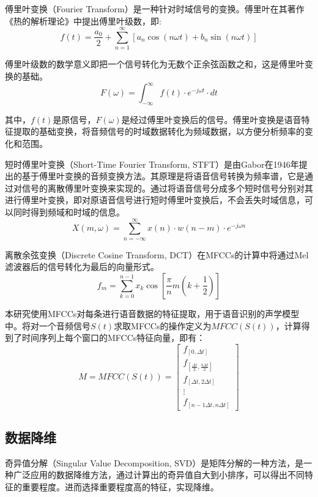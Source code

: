 \documentclass[lang=cn,cite=super]{elegantpaper}
\begin{document}
傅里叶变换（Fourier Transform）是一种针对时域信号的变换。傅里叶在其著作《热的解析理论》\cite{baron2003analytical}中提出傅里叶级数，即:
\begin{equation}
    f(t) = \frac{a_0}{2} +\sum_{n=1}^{\infty} [a_n \cos(n\omega t)+b_n\sin(n\omega t)]
\end{equation}

傅里叶级数的数学意义即把一个信号转化为无数个正余弦函数之和，这是傅里叶变换的基础。
\begin{equation}
    F(\omega) = \int_{-\infty}^{\infty} f(t) \cdot e^{-j\omega t} \cdot dt
\end{equation}

其中，$f(t)$是原信号，$F(\omega)$是经过傅里叶变换后的信号。傅里叶变换是语音特征提取的基础变换，将音频信号的时域数据转化为频域数据，以方便分析频率的变化和范围。

短时傅里叶变换（Short-Time Fourier Transform, STFT）是由Gabor\cite{gabor1946theory}在1946年提出的基于傅里叶变换的音频变换方法。其原理是将语音信号转换为频率谱，它是通过对信号的离散傅里叶变换来实现的。通过将语音信号分成多个短时信号分别对其进行傅里叶变换，即对原语音信号进行短时傅里叶变换后，不会丢失时域信息，可以同时得到频域和时域的信息。
\begin{equation}
    X(m, \omega) = \sum_{n=-\infty}^{\infty} x(n) \cdot w(n-m) \cdot e^{-j\omega n}
\end{equation}

离散余弦变换（Discrete Cosine Transform, DCT）在MFCCs的计算中将通过Mel滤波器后的信号转化为最后的向量形式。
\begin{equation}
    f_m = \sum_{k=0}^{n-1} x_k \cos [\frac{\pi}{n}m(k+\frac{1}{2})]
\end{equation}

本研究使用MFCCs对每条进行语音数据的特征提取，用于语音识别的声学模型中。将对一个音频信号$S(t)$求取MFCCs的操作定义为${MFCC}(S(t))$，计算得到了时间序列上每个窗口的MFCCs特征向量，即有：
\begin{equation}
    M = MFCC(S(t)) = 
    \begin{bmatrix}
        f_{[0,\Delta t]}\\
        f_{[\frac{\Delta t}{2},\frac{3\Delta t}{2}]}\\
        f_{[\Delta t,2\Delta t]}\\
        \vdots\\
        f_{[n-1\Delta t,n\Delta t]}
    \end{bmatrix}
\end{equation}
\subsection{数据降维}
奇异值分解（Singular Value Decomposition, SVD）是矩阵分解的一种方法，是一种广泛应用的数据降维方法，通过计算出的奇异值自大到小排序，可以得出不同特征的重要程度。进而选择重要程度高的特征，实现降维。
\end{document}
